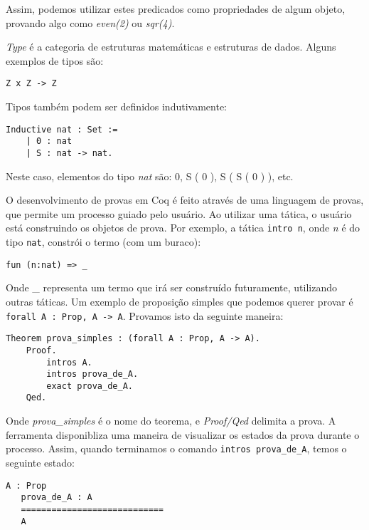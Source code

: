 Assim, podemos utilizar estes predicados como propriedades de algum objeto,
provando algo como \emph{even(2)} ou \emph{sqr(4)}.

\emph{Type} é a categoria de estruturas matemáticas e estruturas de dados.
Alguns exemplos de tipos são:

\begin{lstlisting}[basicstyle=\small]
    Z x Z -> Z
\end{lstlisting}

Tipos também podem ser definidos indutivamente:

\begin{lstlisting}[basicstyle=\small]
    Inductive nat : Set :=
    | 0 : nat
    | S : nat -> nat.
\end{lstlisting}

Neste caso, elementos do tipo \emph{nat} são: 0, S ( 0 ), S ( S ( 0 ) ), etc.

O desenvolvimento de provas em Coq é feito através de uma linguagem de provas,
que permite um processo guiado pelo usuário. Ao utilizar uma tática, o usuário
está construindo os objetos de prova. Por exemplo, a tática
\texttt{intro n}, onde \emph{n} é do tipo \texttt{nat}, constrói o termo (com um
buraco):

\begin{lstlisting}[basicstyle=\small]
    fun (n:nat) => _
\end{lstlisting}

Onde \_ representa um termo que irá ser construído futuramente, utilizando
outras táticas. Um exemplo de proposição simples que podemos querer provar é
\texttt{forall A : Prop, A -> A}. Provamos isto da seguinte maneira:

\begin{lstlisting}[basicstyle=\small]
    Theorem prova_simples : (forall A : Prop, A -> A).
    Proof.
        intros A.
        intros prova_de_A.
        exact prova_de_A.
    Qed.
\end{lstlisting}

Onde \emph{prova\_simples} é o nome do teorema, e \emph{Proof/Qed} delimita a
prova. A ferramenta disponibliza uma maneira de visualizar os estados da prova
durante o processo. Assim, quando terminamos o comando \texttt{intros
prova\_de\_A}, temos o seguinte estado:

\begin{lstlisting}[basicstyle=\small]
   A : Prop
   prova_de_A : A
   ============================
   A
\end{lstlisting}

